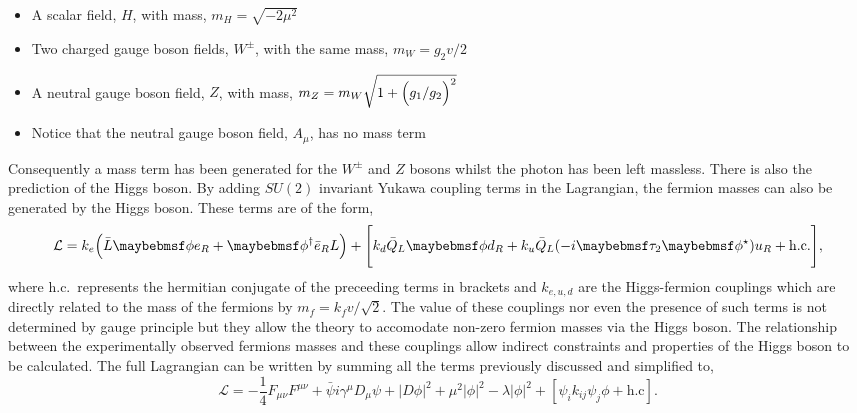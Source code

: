 \begin{itemize}
  \item A scalar field, $H$, with mass, $m_{H} = \sqrt{-2\mu^{2}}$
  \item Two charged gauge boson fields, $W^{\pm}$, with the same mass, $m_{W} = g_{2}v/2$
  \item A neutral gauge boson field, $Z$, with mass, $m_{Z} = m_{W}\sqrt{1+\Bigl(g_{1}/g_{2}\Bigr)^{2}}$
  \item Notice that the neutral gauge boson field, $A_{\mu}$, has no mass term
\end{itemize}

Consequently a mass term has been generated for the $W^{\pm}$ and $Z$ bosons whilst the photon has been left massless. There is also the prediction of the \SM Higgs boson. By adding $SU(2)$ invariant Yukawa coupling terms in the Lagrangian, the fermion masses can also be generated by the Higgs boson. These terms are of the form,
\begin{equation}
  \mathcal{L} = k_{e} \Bigl( \bar{L}\phi e_{R} + \phi^{\dagger}\bar{e}_{R} L \Bigr) + \Biggl[ k_{d}\bar{Q}_{L}\phi d_{R} + k_{u}\bar{Q}_{L}(-i\tau_{2}\phi^{\star})u_{R} + \mathrm{h.c.} \Bigg],
\end{equation}
where h.c.~represents the hermitian conjugate of the preceeding terms in brackets and $k_{e,u,d}$ are the Higgs-fermion couplings which are directly related to the mass of the fermions by $m_{f}=k_{f}v/\sqrt{2}$. The value of these couplings nor even the presence of such terms is not determined by gauge principle but they allow the theory to accomodate non-zero fermion masses via the Higgs boson. The relationship between the experimentally observed fermions masses and these couplings allow indirect constraints and properties of the Higgs boson to be calculated. The full \SM Lagrangian can be written by summing all the terms previously discussed and simplified to,
\begin{equation}
  \mathcal{L} = -\frac{1}{4}F_{\mu\nu}F^{\mu\nu} + \bar{\psi}i\gamma^{\mu}D_{\mu}\psi + |D\phi|^{2} +\mu^{2}|\phi|^{2} -\lambda|\phi|^{2} + [ \psi_{i}k_{ij}\psi_{j}\phi + \mathrm{h.c} ].
\end{equation}


